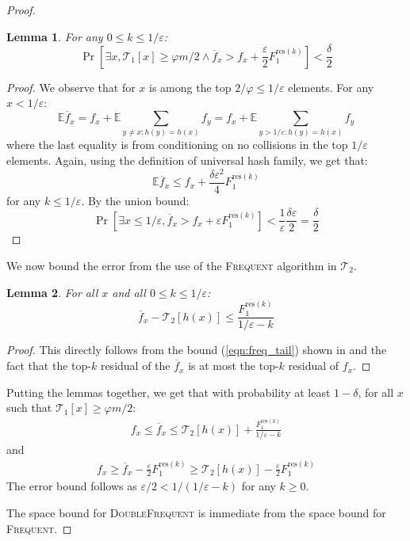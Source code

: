 \documentclass{article}
\newcommand{\ignore}[1]{}
\newcommand{\eps}{\varepsilon}
\renewcommand{\phi}{\varphi}
\newtheorem{lemma}{Lemma}
\begin{document}
\begin{multicols}{2}
\begin{proof}
\begin{lemma}
For any $0 \leq k \leq 1/\eps$:
$$\Pr[\exists x, \mathcal{T}_1[x] \geq \phi m/2 \wedge \overline{f}_x > f_x +\frac{\eps}{2} F_1^{\text{res}(k)}] < \frac{\delta}{2}$$
\end{lemma}
\begin{proof}
We observe that for $x$ is among the top $2/\phi \leq 1/\eps$ elements. For any $x<1/\eps$:
\begin{equation*}
\mathbb{E} \overline{f}_x = f_x + \mathbb{E} \sum_{y \neq x: h(y)=h(x)} f_y
 = f_x + \mathbb{E} \sum_{y > 1/\eps: h(y)=h(x)} f_y
\end{equation*}
where the last equality is from conditioning on no collisions in the top $1/\eps$ elements. Again, using the definition of universal hash family, we get that:
$$\mathbb{E} \overline{f}_x \leq f_x + \frac{\delta \eps^2}{4} F_1^{\text{res}(k)}$$
for any $k \leq 1/\eps$. By the union bound:
$$\Pr[\exists x \leq 1/\eps, \overline{f}_x > f_x + \eps F_1^{\text{res}(k)}]< \frac{1}{\eps} \frac{\delta\eps}{2} = \frac{\delta}{2}$$
\end{proof}
We now bound the error from the use of the \textsc{Frequent} algorithm in $\mathcal{T}_2$.
\begin{lemma}
For all $x$ and all $0 \leq k \leq 1/\eps$:
$$\overline{f}_x - \mathcal{T}_2[h(x)] \leq \frac{F_1^{\text{res}(k)}}{1/\eps - k}$$
\end{lemma}
\begin{proof}
This directly follows from the bound (\ref{eqn:freq_tail}) shown in \cite{BICS} and the fact that the top-$k$ residual of the $\overline{f}_x$ is at most the top-$k$ residual of $f_x$.
\end{proof}
Putting the lemmas together, we get that with probability at least $1-\delta$, for all $x$ such that $\mathcal{T}_1[x] \geq \phi m/2$:
\begin{align*}
f_x \leq \overline{f}_x \leq \mathcal{T}_2[h(x)] + \frac{F_1^{\text{res}(k)}}{1/\eps -k}
\end{align*}
and
\begin{align*}
f_x \geq \overline{f}_x - \frac{\eps}{2} F_1^{\text{res}(k)} \geq \mathcal{T}_2[h(x)] - \frac{\eps}{2} F_1^{\text{res}(k)} 
\end{align*}
The error bound follows as $\eps/2 < 1/(1/\eps - k)$ for any $k \geq 0$.

The space bound for \textsc{DoubleFrequent} is immediate from the space bound for \textsc{Frequent}.
\end{proof}
\ignore{
	  Assumption $1/\varepsilon>1/\varepsilon $
	  Without loss of generality suppose\\
	   $f_1 \geq f_2 \geq.......\geq f_n$\\
	   \\
	   \hspace*{3cm}$$F^{res(k)}_1=\sum_{i=k+1}^n f_{i}$$\\
	   \\
	   For any $x$ in $\mathcal{T}_{1}$, let $\delta_x=|f_x-T[h(x)]|$\\
	   
}
\end{multicols}
\end{document}
